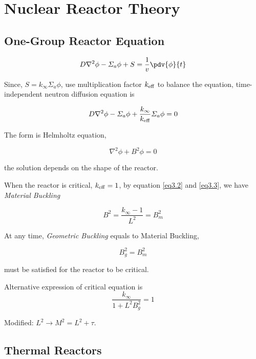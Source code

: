 \section{Nuclear Reactor Theory}

\subsection{One-Group Reactor Equation}

\begin{equation}
    D\nabla^2 \phi - \varSigma_a \phi + S = \frac{1}{v}\pdv{\phi}{t}
\end{equation}

Since, $S = k_{\infty} \varSigma_a \phi$,  use multiplication factor $k_{\rm eff}$ to balance the equation, time-independent neutron diffusion equation is

\begin{equation}
    D\nabla^2 \phi - \varSigma_a \phi + \frac{k_{\infty}}{k_{\rm eff}} \varSigma_a \phi = 0
    \label{eq3.2}
\end{equation}

The form is Helmholtz equation, 

\begin{equation}
    \nabla^2 \phi + B^2 \phi = 0
    \label{eq3.3}
\end{equation}

the solution depends on the shape of the reactor.

When the reactor is critical, $k_{\rm eff} = 1$, by equation \ref{eq3.2} and \ref{eq3.3}, we have {\itshape Material Buckling}

\begin{equation}
    B^2 = \frac{k_{\infty} - 1}{L^2} = B_m^2
\end{equation}

At any time, {\itshape Geometric Buckling} equals to Material Buckling,

\begin{equation}
    B_g^2 = B_m^2
\end{equation}

must be satisfied for the reactor to be critical.

Alternative expression of critical equation is
\begin{equation}
    \frac{k_{\infty}}{1 + L^2 B_g^2} = 1
\end{equation}

Modified: $L^2 \longrightarrow M^2 = L^2 + \tau$.

\subsection{Thermal Reactors}

